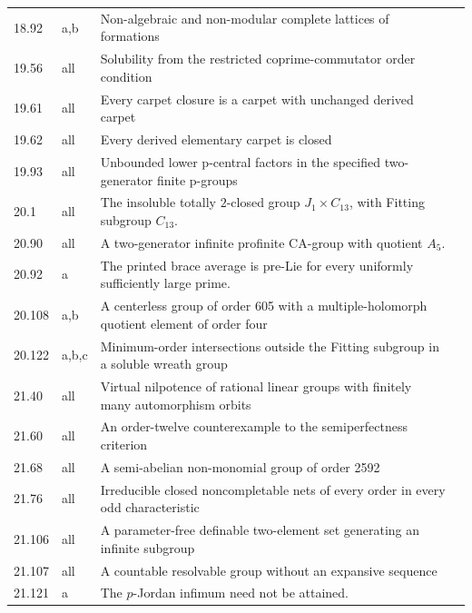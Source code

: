 \begin{longtable}{@{}p{}p{}>{\raggedright\arraybackslash}p{}r@{}}
18.92 & a,b & Non-algebraic and non-modular complete lattices of formations & \pageref{cand:18.92} \\
19.56 & all & Solubility from the restricted coprime-commutator order condition & \pageref{cand:19.56} \\
19.61 & all & Every carpet closure is a carpet with unchanged derived carpet & \pageref{cand:19.61} \\
19.62 & all & Every derived elementary carpet is closed & \pageref{cand:19.62} \\
19.93 & all & Unbounded lower p-central factors in the specified two-generator finite p-groups & \pageref{cand:19.93} \\
20.1 & all & The insoluble totally $2$-closed group $J_1\times C_{13}$, with Fitting subgroup $C_{13}$. & \pageref{cand:20.1} \\
20.90 & all & A two-generator infinite profinite CA-group with quotient $A_5$. & \pageref{cand:20.90} \\
20.92 & a & The printed brace average is pre-Lie for every uniformly sufficiently large prime. & \pageref{cand:20.92} \\
20.108 & a,b & A centerless group of order 605 with a multiple-holomorph quotient element of order four & \pageref{subsec:holomorph} \\
20.122 & a,b,c & Minimum-order intersections outside the Fitting subgroup in a soluble wreath group & \pageref{cand:20.122} \\
21.40 & all & Virtual nilpotence of rational linear groups with finitely many automorphism orbits & \pageref{cand:21.40} \\
21.60 & all & An order-twelve counterexample to the semiperfectness criterion & \pageref{cand:21.60} \\
21.68 & all & A semi-abelian non-monomial group of order 2592 & \pageref{subsec:semiabelian} \\
21.76 & all & Irreducible closed noncompletable nets of every order in every odd characteristic & \pageref{cand:21.76} \\
21.106 & all & A parameter-free definable two-element set generating an infinite subgroup & \pageref{subsec:concise} \\
21.107 & all & A countable resolvable group without an expansive sequence & \pageref{cand:21.107} \\
21.121 & a & The $p$-Jordan infimum need not be attained. & \pageref{cand:21.121} \\
\end{longtable}
\normalsize
